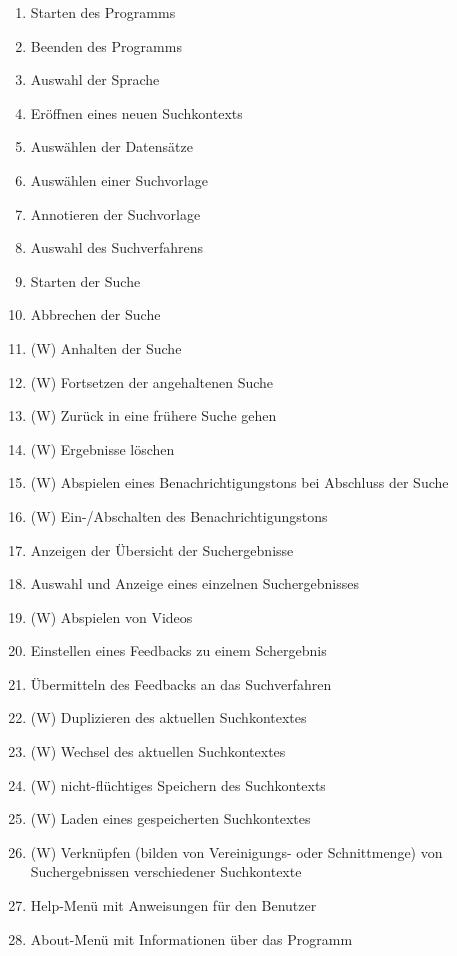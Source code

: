 \begin{enumerate} [label=\bfseries /F \arabic*0/]
	\item Starten des Programms
	\item Beenden des Programms
	\item Auswahl der Sprache
	\item Er\"offnen eines neuen Suchkontexts
	\item Ausw\"ahlen der Datens\"atze
	\item Ausw\"ahlen einer Suchvorlage
	\item Annotieren der Suchvorlage
	\item Auswahl des Suchverfahrens
	\item Starten der Suche
	\item Abbrechen der Suche
	\item (W) Anhalten der Suche
	\item (W) Fortsetzen der angehaltenen Suche
	\item (W) Zurück in eine frühere Suche gehen
	\item (W) Ergebnisse löschen
	\item (W) Abspielen eines Benachrichtigungstons bei Abschluss der Suche
	\item (W) Ein-/Abschalten des Benachrichtigungstons
	\item Anzeigen der \"Ubersicht der Suchergebnisse
	\item Auswahl und Anzeige eines einzelnen Suchergebnisses
	\item (W) Abspielen von Videos
	\item Einstellen eines Feedbacks zu einem Schergebnis
	\item \"Ubermitteln des Feedbacks an das Suchverfahren
	\item (W) Duplizieren des aktuellen Suchkontextes
	\item (W) Wechsel des aktuellen Suchkontextes
	\item (W) nicht-fl\"uchtiges Speichern des Suchkontexts
	\item (W) Laden eines gespeicherten Suchkontextes
	\item (W) Verkn\"upfen (bilden von Vereinigungs- oder Schnittmenge) von Suchergebnissen verschiedener Suchkontexte
	\item Help-Menü mit Anweisungen für den Benutzer
	\item About-Menü mit Informationen über das Programm
\end{enumerate}

